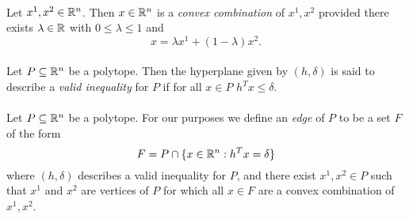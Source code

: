 \paragraph{}Let $x^1, x^2 \in \mathbb{R}^n$. Then $x \in \mathbb{R}^n$ is a {\it convex combination} of $x^1, x^2$ provided there exists $\lambda \in \mathbb{R}$ with $0 \leq \lambda \leq 1$ and $$x = \lambda x^1 + (1-\lambda)x^2.$$

\paragraph{}Let $P\subseteq \mathbb{R}^n$ be a polytope. Then the hyperplane given by $(h,\delta)$ is said to describe a {\it valid inequality} for $P$ if for all $x \in P$ $h^Tx \leq \delta$.

\paragraph{}Let $P \subseteq \mathbb{R}^n$ be a polytope. For our purposes we define an {\it edge} of $P$ to be a set $F$ of the form $$F = P \cap \{x \in \mathbb{R}^n: h^Tx = \delta \}$$ where $(h,\delta)$ describes a valid inequality for $P$, and there exist $x^1, x^2 \in P$ such that $x^1$ and $x^2$ are vertices of $P$ for which all $x \in F$ are a convex combination of $x^1, x^2$.

